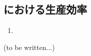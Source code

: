 \subsection{\EndFaceChamferMilling における生産効率}

\begin{Issues}{\TBW}
\begin{enumerate}[label=\sarrow]
\item[{\sarrow[red]}]
\end{enumerate}
\end{Issues}


\clearpage
(to be written...)



